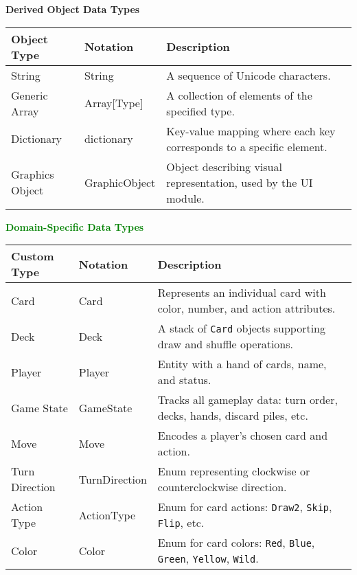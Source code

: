 \documentclass[12pt, titlepage]{article}
\newcommand{\added}[1]{\textcolor{green}{#1}}
\begin{document}
\vspace{1em}
\noindent 
\newpage
\textbf{Derived Object Data Types}

\begin{center}
\renewcommand{\arraystretch}{1.2}
\begin{tabular}{l l p{8cm}} 
\toprule 
\textbf{Object Type} & \textbf{Notation} & \textbf{Description}\\ 
\midrule
String & String & A sequence of Unicode characters.\\
Generic Array & Array[Type] & A collection of elements of the specified type.\\
Dictionary & dictionary & Key-value mapping where each key corresponds to a specific element.\\
Graphics Object & GraphicObject & Object describing visual representation, used by the UI module.\\
\bottomrule
\end{tabular} 
\end{center}

\vspace{1em}
\noindent
\textbf{\added{Domain-Specific Data Types}}

\begin{center}
\renewcommand{\arraystretch}{1.2}
\begin{tabular}{l l p{8cm}} 
\toprule 
\textbf{Custom Type} & \textbf{Notation} & \textbf{Description}\\ 
\midrule
Card & Card & Represents an individual card with color, number, and action attributes.\\
Deck & Deck & A stack of \texttt{Card} objects supporting draw and shuffle operations.\\
Player & Player & Entity with a hand of cards, name, and status.\\
Game State & GameState & Tracks all gameplay data: turn order, decks, hands, discard piles, etc.\\
Move & Move & Encodes a player's chosen card and action.\\
Turn Direction & TurnDirection & Enum representing clockwise or counterclockwise direction.\\
Action Type & ActionType & Enum for card actions: \texttt{Draw2}, \texttt{Skip}, \texttt{Flip}, etc.\\
Color & Color & Enum for card colors: \texttt{Red}, \texttt{Blue}, \texttt{Green}, \texttt{Yellow}, \texttt{Wild}.\\
\bottomrule
\end{tabular} 
\end{center}
\end{document}
